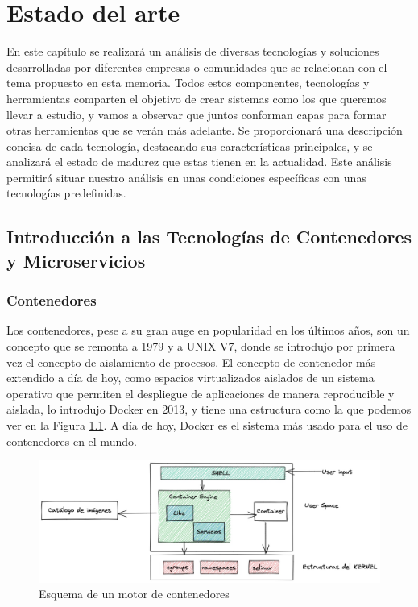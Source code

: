 \chapter{Estado del arte}
\label{ch:estado-del-arte}

En este capítulo se realizará un análisis de diversas tecnologías y soluciones desarrolladas por diferentes empresas o comunidades que se relacionan con el tema propuesto en esta memoria. Todos estos componentes, tecnologías y herramientas comparten el objetivo de crear sistemas como los que queremos llevar a estudio, y vamos a observar que juntos conforman capas para formar otras herramientas que se verán más adelante. Se proporcionará una descripción concisa de cada tecnología, destacando sus características principales, y se analizará el estado de madurez que estas tienen en la actualidad. Este análisis permitirá situar nuestro análisis en unas condiciones específicas con unas tecnologías predefinidas.

\section{Introducción a las Tecnologías de Contenedores y Microservicios}

\subsection{Contenedores}

Los contenedores, pese a su gran auge en popularidad en los últimos años, son un concepto que se remonta a 1979 y a UNIX V7, donde se introdujo por primera vez el concepto de aislamiento de procesos. El concepto de contenedor más extendido a día de hoy, como espacios virtualizados aislados de un sistema operativo que permiten el despliegue de aplicaciones de manera reproducible y aislada, lo introdujo Docker en 2013, y tiene una estructura como la que podemos ver en la Figura \ref{fig:container-engine}. A día de hoy, Docker es el sistema más usado para el uso de contenedores en el mundo.

\begin{figure}[h!]
    \centering
    \includegraphics[width=1\linewidth]{figures/container-engine.jpg}
    \caption{Esquema de un motor de contenedores}
    \label{fig:container-engine}
\end{figure}


